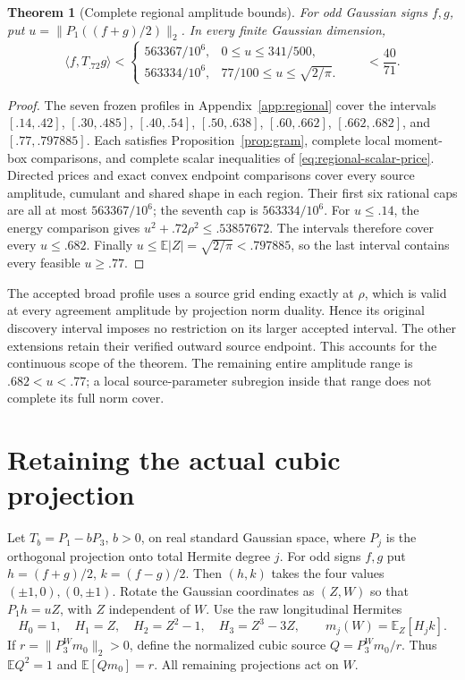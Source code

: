 \documentclass[11pt]{article}
\newcommand{\E}{\mathbb E}
\newtheorem{theorem}{Theorem}
\begin{document}
\begin{theorem}[Complete regional amplitude bounds]\label{thm:regional-coverage}
For odd Gaussian signs $f,g$, put $u=\|P_1((f+g)/2)\|_2$.
In every finite Gaussian dimension,
\[
 \langle f,T_{.72}g\rangle<
 \begin{cases}
 563367/10^6,&0\le u\le341/500,\\[2pt]
 563334/10^6,&77/100\le u\le\sqrt{2/\pi}.
 \end{cases}
 \qquad <\frac{40}{71}.
\]
\end{theorem}
\begin{proof}
The seven frozen profiles in Appendix~\ref{app:regional} cover the
intervals $[.14,.42]$, $[.30,.485]$, $[.40,.54]$, $[.50,.638]$,
$[.60,.662]$, $[.662,.682]$, and $[.77,.797885]$.
Each satisfies Proposition~\ref{prop:gram}, complete local moment-box
comparisons, and complete scalar inequalities of
\eqref{eq:regional-scalar-price}. Directed prices and exact convex
endpoint comparisons cover every source amplitude, cumulant and
shared shape in each region. Their first six rational caps are all
at most $563367/10^6$; the seventh cap is $563334/10^6$.
For $u\le.14$, the energy comparison gives
$u^2+.72\rho^2\le.53857672$. The intervals therefore cover every
$u\le.682$. Finally $u\le\E|Z|=\sqrt{2/\pi}<.797885$, so the last
interval contains every feasible $u\ge.77$.
\end{proof}

The accepted broad profile uses a source grid ending exactly at
$\rho$, which is valid at every agreement amplitude by projection
norm duality. Hence its original discovery interval imposes no
restriction on its larger accepted interval. The other extensions
retain their verified outward source endpoint. This accounts for
the continuous scope of the theorem. The remaining entire amplitude
range is $.682<u<.77$; a local source-parameter subregion inside that
range does not complete its full norm cover.

\section{Retaining the actual cubic projection}\label{sec:r3}
Let $T_b=P_1-bP_3$, $b>0$, on real standard Gaussian space, where $P_j$
is the orthogonal projection onto total Hermite degree $j$.
For odd signs $f,g$ put $h=(f+g)/2$, $k=(f-g)/2$.
Then $(h,k)$ takes the four values $(\pm1,0),(0,\pm1)$.
Rotate the Gaussian coordinates as $(Z,W)$ so that $P_1h=uZ$,
with $Z$ independent of $W$.  Use the raw longitudinal Hermites
\[
 H_0=1,\quad H_1=Z,\quad H_2=Z^2-1,\quad H_3=Z^3-3Z,
 \qquad m_j(W)=\mathbb E_Z[H_jk].
\]
If $r=\|P_3^Wm_0\|_2>0$, define the normalized cubic source
$Q=P_3^Wm_0/r$.  Thus $\mathbb EQ^2=1$ and
$\mathbb E[Qm_0]=r$.  All remaining projections act on $W$.
\end{document}

